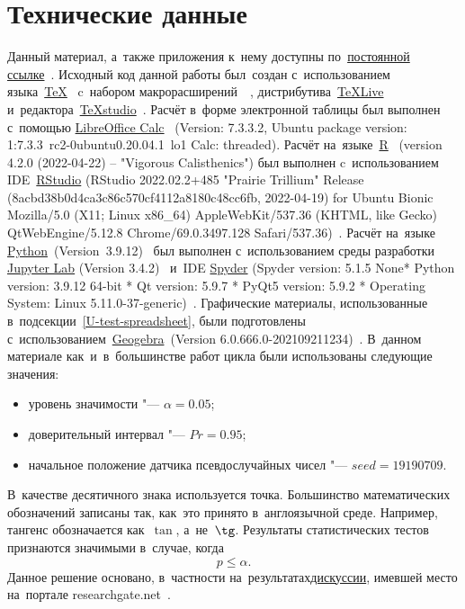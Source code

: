 \documentclass[]{scrreprt}
\begin{document}
\chapter{Технические данные}
Данный материал, а~также приложения к~нему доступны по~\href{https://github.com/Kirill-Murashev/AI_for_valuers_book/tree/main/Parts-Chapters/Mann-Whitney-Wilcoxon}{постоянной ссылке}~\cite{Murashev:u-test}. Исходный код данной работы был~создан с~использованием языка~\href{https://www.ctan.org/}{\TeX}~\cite{TeX:site} c~набором макрорасширений~\href{https://www.latex-project.org/}{\LaTeXe}~\cite{LaTeX:site}, дистрибутива~\href{https://www.tug.org/texlive/}{TeXLive}~\cite{TeXLive:site} и~редактора~\href{https://www.texstudio.org/}{TeXstudio}~\cite{TeXstudio:site}. Расчёт в~форме электронной таблицы был выполнен с~помощью \href{https://www.libreoffice.org/discover/calc/}{LibreOffice Calc}~\cite{LO:Calc} (Version: 7.3.3.2, Ubuntu package version: 1:7.3.3~rc2-0ubuntu0.20.04.1~lo1 Calc: threaded). Расчёт на~языке~\href{https://www.r-project.org/}{R}~\cite{R_language} (version 4.2.0 (2022-04-22) -- "Vigorous Calisthenics") был выполнен c~использованием IDE~\href{https://www.rstudio.com/}{RStudio} (RStudio 2022.02.2+485 "Prairie Trillium" Release (8acbd38b0d4ca3c86c570cf4112a8180c48cc6fb, 2022-04-19) for Ubuntu Bionic Mozilla/5.0 (X11; Linux x86\_64) AppleWebKit/537.36 (KHTML, like Gecko) QtWebEngine/5.12.8 Chrome/69.0.3497.128 Safari/537.36)~\cite{RStudio:official_site}. Расчёт на~языке \href{https://www.python.org/}{Python}~(Version~3.9.12)~\cite{Python:site} был выполнен с~использованием среды разработки \href{https://jupyter.org}{Jupyter Lab} (Version 3.4.2)~\cite{Jupyter:site} и~IDE \href{https://www.spyder-ide.org/}{Spyder} (Spyder version: 5.1.5 None* Python version: 3.9.12 64-bit * Qt version: 5.9.7 * PyQt5 version: 5.9.2
* Operating System: Linux 5.11.0-37-generic)~\cite{Spyder:site}. Графические материалы, использованные в~подсекции~\ref{U-test-spreadsheet}, были подготовлены с~использованием~\href{Geogebra:official-site}{Geogebra}~(Version 6.0.666.0-202109211234)~\cite{Geogebra:official-site}.
В~данном материале как~и~в~большинстве работ цикла были использованы следующие значения:
\begin{itemize}
	\item уровень значимости "--- $\alpha = 0.05$;
	\item доверительный интервал "--- $Pr = 0.95$;
	\item начальное положение датчика псевдослучайных чисел "--- $seed = 19190709$.
\end{itemize}
В~качестве десятичного знака используется точка. Большинство математических обозначений записаны так, как~это принято в~англоязычной среде. Например, тангенс обозначается как~$\tan$, а~не~$\tg$. Результаты статистических тестов признаются значимыми в~случае, когда
\begin{equation}\label{eq:ignificance }
 p \leq \alpha.
\end{equation}
Данное решение основано, в~частности на~результатах\href{researchgate.net}{дискуссии}, имевшей место на~портале researchgate.net~\cite{RG:p-equals-alpha}.
%
\end{document}

